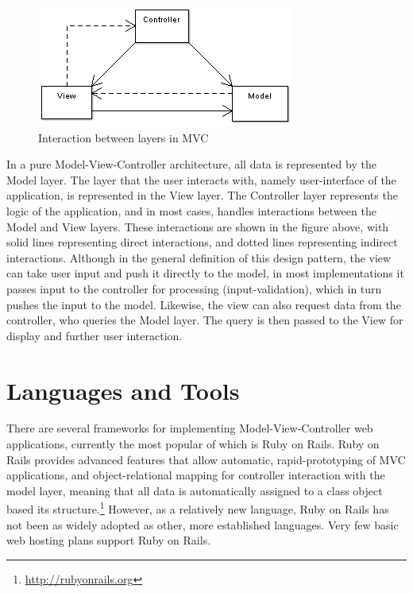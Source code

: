 \documentclass[a4paper,12pt]{report}
\begin{document}
\begin{figure}[h]
\begin{center}
\includegraphics[scale=0.6]{./images/mvc.png}
\end{center}
\caption{Interaction between layers in MVC}
\end{figure}
In a pure Model-View-Controller architecture, all data is represented by the Model layer. The layer that the user interacts with, namely user-interface of the application, is represented in the View layer. The Controller layer represents the logic of the application, and in most cases, handles interactions between the Model and View layers. These interactions are shown in the figure above, with solid lines representing direct interactions, and dotted lines representing indirect interactions. Although in the general definition of this design pattern, the view can take user input and push it directly to the model, in most implementations it passes input to the controller for processing (input-validation), which in turn pushes the input to the model. Likewise, the view can also request data from the controller, who queries the Model layer. The query is then passed to the View for display and further user interaction.

\section{Languages and Tools}
There are several frameworks for implementing Model-View-Controller web applications, currently the most popular of which is Ruby on Rails. Ruby on Rails provides advanced features that allow automatic, rapid-prototyping of MVC applications, and object-relational mapping for controller interaction with the model layer, meaning that all data is automatically assigned to a class object based its structure.\footnote{\url{http://rubyonrails.org}} However, as a relatively new language, Ruby on Rails has not been as widely adopted as other, more established languages. Very few basic web hosting plans support Ruby on Rails. 
\end{document}
